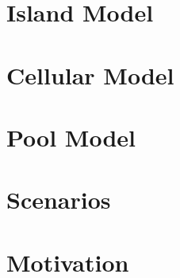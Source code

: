 \section{Island Model}\label{section:island model}


\section{Cellular Model}\label{section:cellular model}


\section{Pool Model}\label{section:pool model}


\section{Scenarios}\label{section:scenarios}


\section{Motivation}\label{section:motivation}
